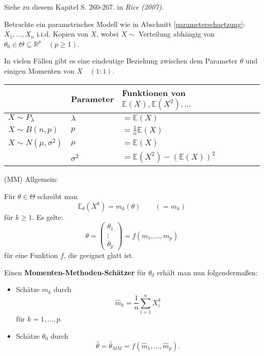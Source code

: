 \documentclass{tstextbook}
\newcommand{\E}{\mathbb E}
\newcommand{\R}{\mathbb R}
\begin{document}
\begin{book}
 Siehe zu diesem Kapitel S. 260-267. in	\textit{Rice (2007)}.
\end{book}


Betrachte ein parametrisches Modell wie in Abschnitt \ref{parameterschaetzung}:
$ X_1,\ldots,X_n $ i.i.d. Kopien von $ X $, wobei $ X \sim $ Verteilung abhängig von $ \theta_0 \in \Theta \subseteq \R^p \quad (p\ge1) $.

In vielen Fällen gibt es eine eindeutige Beziehung zwischen dem Parameter $ \theta $ und einigen Momenten von $ X \quad (1:1) $.

\begin{example}
	
	
	\begin{tabular}{l|ll}
								& Parameter 	& Funktionen von $ \E(X), \E(X^2),\ldots $ \\
		\midrule
		$ X\sim P_\lambda $ 	& $ \lambda	$	& $ = \E(X) $\\
		\midrule
		$ X\sim B(n,p) $ 		& $ p $			& $ = \frac{1}{n} \E(X) $\\
		\midrule
		$ X\sim N(\mu, \sigma^2) $ & $ \mu $	& $ = \E(X) $\\
								& $ \sigma^2 $	& $ = \E(X^2)-(\E(X))^2 $
	\end{tabular}
\end{example}

	\begin{remark}
		(MM) Allgemein:
	
		Für $ \theta \in \Theta $ schreibt man 
		\[
		\E_\theta(X^k) = m_k(\theta) \qquad (=m_k)
		\]
		für $ k\ge1 $. Es gelte: 
		\[
		\theta = \begin{pmatrix}
			\theta_1 \\ \vdots \\ \theta_p
		\end{pmatrix} = f\left(m_1,\ldots,m_p\right)
		\]
		für eine Funktion $ f $, die geeignet glatt ist.
		
	\end{remark}


Einen \textbf{Momenten-Methoden-Schätzer}  für $ \theta_0 $ erhält man nun folgendermaßen: 
	\begin{itemize}
		\item Schätze $ m_k $ durch \[ \hat{m}_k = \frac{1}{n} \sum_{i=1}^{n} X_i^k \] für $ k=1,\ldots,p $.
		\item Schätze $ \theta_0 $ durch \[\hat{\theta} = {\hat{\theta}}_{MM} = f\left(\hat{m}_1,\ldots,\hat{m}_p \right). \]
	\end{itemize}
\end{document}
